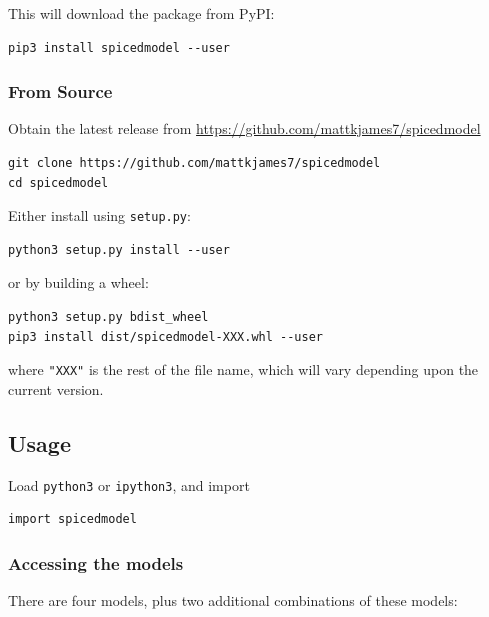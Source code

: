 				This will download the package from PyPI:

\begin{verbatim}
pip3 install spicedmodel --user
\end{verbatim}

			\subsubsection{From Source}

			Obtain the latest release from \url{https://github.com/mattkjames7/spicedmodel}

\begin{verbatim}
git clone https://github.com/mattkjames7/spicedmodel
cd spicedmodel
\end{verbatim}

			Either install using \texttt{setup.py}:

\begin{verbatim}
python3 setup.py install --user
\end{verbatim}

			or by building a wheel:

\begin{verbatim}
python3 setup.py bdist_wheel
pip3 install dist/spicedmodel-XXX.whl --user
\end{verbatim}

			where \texttt{"XXX"} is the rest of the file name, which will vary depending upon the current version.

			\subsection{Usage}

				Load \texttt{python3} or \texttt{ipython3}, and import

\begin{verbatim}
import spicedmodel
\end{verbatim}

			\subsubsection{Accessing the models}

				There are four models, plus two additional combinations of these models:

